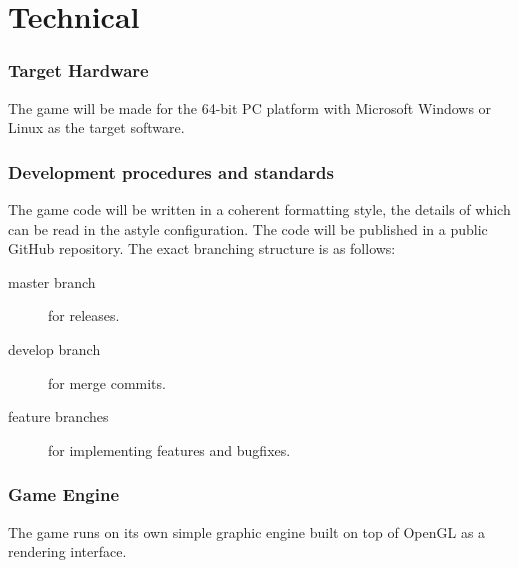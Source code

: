 \part{Technical}
\section{Target Hardware} %
The game will be made for the 64-bit PC platform with Microsoft Windows
or Linux as the target software.
\section{Development procedures and standards}
The game code will be written in a coherent formatting style, the details of
which can be read in the astyle configuration. %
The code will be published in a public GitHub repository. The exact branching
structure is as follows:
\begin{description}
    \item[master branch] for releases.
    \item[develop branch] for merge commits.
    \item[feature branches] for implementing features and bugfixes.
\end{description}
\section{Game Engine}
The game runs on its own simple graphic engine built on top of OpenGL as a
rendering interface. %
